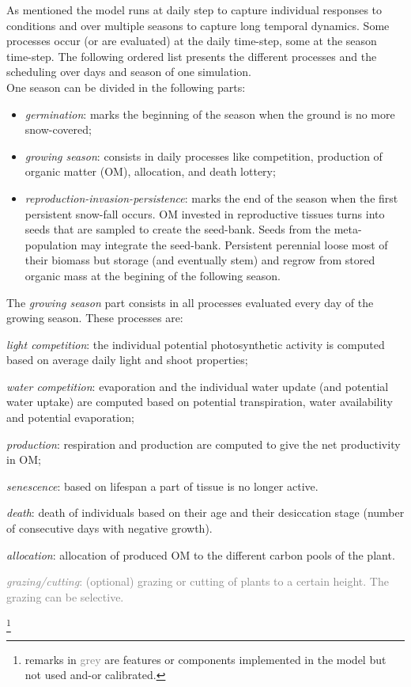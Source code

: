 \documentclass[a4paper,twoside, justified,marginals=raggedright, nobib]{tufte-handout}
\begin{document}
As mentioned the model runs at daily step to capture individual responses to conditions and over multiple seasons to capture long temporal dynamics. Some processes occur (or are evaluated) at the daily time-step, some at the season time-step. The following ordered list presents the different processes and the scheduling over days and season of one simulation.\\
\indent One season can be divided in the following parts:
\begin{itemize}
\setlength\itemsep{0em}
\item \textit{germination}: marks the beginning of the season when the ground is no more snow-covered;
\item \textit{growing season}: consists in daily processes like competition, production of organic matter (OM), allocation, and death lottery;
\item \textit{reproduction-invasion-persistence}: marks the end of the season when the first persistent snow-fall occurs. OM invested in reproductive tissues turns into seeds that are sampled to create the seed-bank. Seeds from the meta-population may integrate the seed-bank. Persistent perennial loose most of their biomass but storage (and eventually stem) and regrow from stored organic mass at the begining of the following season.
\end{itemize}

The \textit{growing season} part consists in all processes evaluated every day of the growing season. These processes are:
\begin{itemize}
\setlength\itemsep{0em}
\item \textit{light competition}: the individual potential photosynthetic activity is computed based on average daily light and shoot properties;
\item \textit{water competition}: evaporation and the individual water update (and potential water uptake) are computed based on potential transpiration, water availability and potential evaporation;
\item \textit{production}: respiration and production are computed to give the net productivity in OM;
\item \textit{senescence}: based on lifespan a part of tissue is no longer active.
\item \textit{death}: death of individuals based on their age and their desiccation stage (number of consecutive days with negative growth).
\item \textit{allocation}: allocation of produced OM to the different carbon pools of the plant.
\textcolor{Gray}{\item \textit{grazing/cutting}: (optional) grazing or cutting of plants to a certain height. The grazing can be selective.}\footnote{remarks in \textcolor{Gray}{grey} are features or components implemented in the model but not used and-or calibrated.}
\end{itemize}
\end{document}
